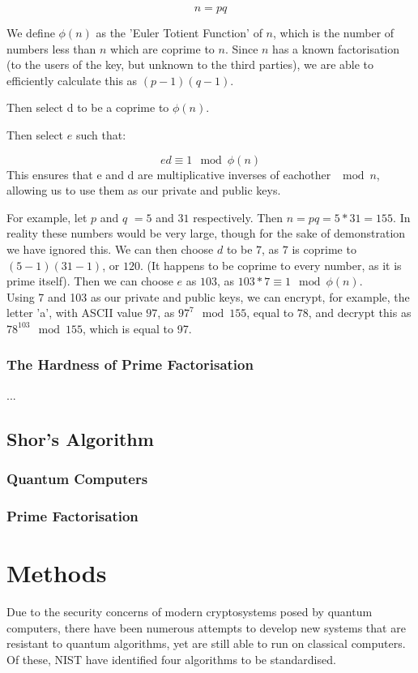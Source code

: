 \documentclass{article}
\begin{document}
\[
   n = pq 
\]

We define $\phi(n)$ as the 'Euler Totient Function' of $n$, which is the number of numbers less than $n$ which are coprime to $n$.
Since $n$ has a known factorisation (to the users of the key, but unknown to the third parties), we are able to efficiently 
calculate this as $(p-1)(q-1)$.

Then select d to be a coprime to $\phi(n)$.

Then select $e$ such that:

\[
   ed \equiv 1\mod\phi(n)
\]
This ensures that e and d are multiplicative inverses of eachother $\mod n$, allowing us to use them as our private and public keys.

For example, let $p$ and $q$ $= 5$ and $31$ respectively. Then $n = pq = 5 * 31
= 155$. In reality these numbers would be very large, though for the sake of demonstration we have ignored this.
We can then choose $d$ to be $7$, as $7$ is coprime to $(5-1)(31-1)$, or $120$. (It happens to be coprime to every
number, as it is prime itself). Then we can choose $e$ as $103$, as $103 * 7 \equiv 1 \mod\phi(n)$.
\\
Using 7 and 103 as our private and public keys, we can encrypt, for example,
the letter 'a', with ASCII value $97$, as $97^7 \mod 155$, equal to $78$, and
decrypt this as $78^{103}\mod 155$, which is equal to 97.

\subsubsection{The Hardness of Prime Factorisation}
   ...

\subsection{Shor's Algorithm}
\subsubsection{Quantum Computers}
\subsubsection{Prime Factorisation}

\section{Methods}
Due to the security concerns of modern cryptosystems posed by quantum
computers, there have been numerous attempts to develop new systems that are
resistant to quantum algorithms, yet are still able to run on classical
computers. Of these, NIST have identified four algorithms to be standardised.
\end{document}
